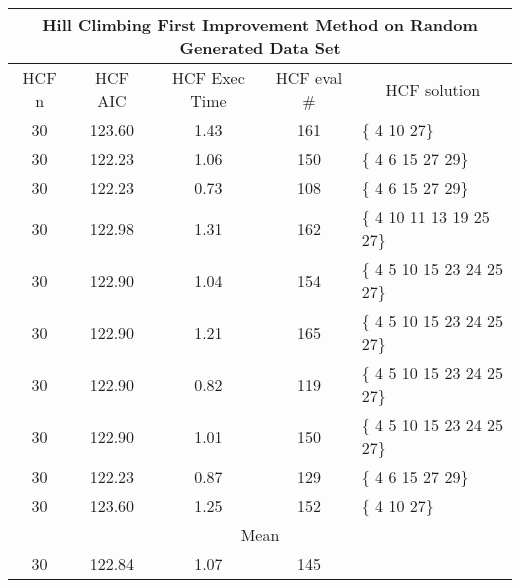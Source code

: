 \begin{tabular}{|c|c|c|c|l|}
	\hline
	\multicolumn{5}{|c|}{Hill Climbing First Improvement Method on Random Generated Data Set}          \\ \hline
	HCF n & HCF AIC     & HCF Exec Time & HCF eval \# & \multicolumn{1}{c|}{HCF solution} \\ \hline
	30    & 123.60 & 1.43              & 161                    & \{ 4 10 27\}                      \\ \hline
	30    & 122.23 & 1.06              & 150                    & \{ 4 6 15 27 29\}                 \\ \hline
	30    & 122.23 & 0.73              & 108                    & \{ 4 6 15 27 29\}                 \\ \hline
	30    & 122.98  & 1.31              & 162                    & \{ 4 10 11 13 19 25 27\}          \\ \hline
	30    & 122.90 & 1.04              & 154                    & \{ 4 5 10 15 23 24 25 27\}        \\ \hline
	30    & 122.90 & 1.21              & 165                    & \{ 4 5 10 15 23 24 25 27\}        \\ \hline
	30    & 122.90 & 0.82               & 119                    & \{ 4 5 10 15 23 24 25 27\}        \\ \hline
	30    & 122.90 & 1.01              & 150                    & \{ 4 5 10 15 23 24 25 27\}        \\ \hline
	30    & 122.23 & 0.87              & 129                    & \{ 4 6 15 27 29\}                 \\ \hline
	30    & 123.60 & 1.25              & 152                    & \{ 4 10 27\}                      \\ \hline
	\multicolumn{5}{|c|}{Mean}                                                                            \\ \hline
	30    & 122.84  & 1.07             & 145                    &                                   \\ \hline
\end{tabular}

